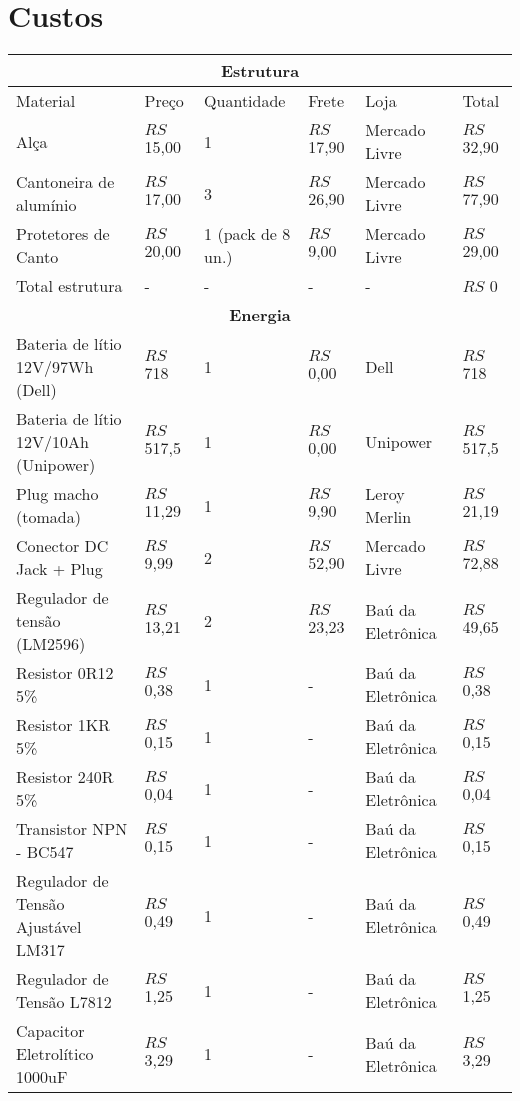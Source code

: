 \section{Custos}

    
\begin{table}[h!]
\centering
\begin{tabular}{| m{4cm}|m{2cm}|m{2cm}|m{2cm}|m{2cm}|m{2cm}|}
\hline
\multicolumn{6}{|c|}{\textbf{Estrutura}}\\
\hline
Material & Preço  & Quantidade & Frete & Loja & Total  \\ 
\hline
Alça & $RS$ 15,00 & 1 & $RS$ 17,90 & Mercado Livre & $RS$ 32,90 \\ \hline
Cantoneira de alumínio & $RS$ 17,00 & 3 & $RS$ 26,90 & Mercado Livre & $RS$ 77,90 \\ \hline
Protetores de Canto & $RS$ 20,00 & 1 (pack de 8 un.) & $RS$ 9,00 & Mercado Livre & $RS$ 29,00 \\ \hline
Total estrutura & - & - & - & - & $RS$ 0 \\\hline
\multicolumn{6}{|c|}{\textbf{Energia}}\\
\hline
Bateria de lítio 12V/97Wh (Dell) & $RS$ 718 & 1 & $RS$ 0,00 & Dell & $RS$ 718 \\\hline
Bateria de lítio 12V/10Ah (Unipower) & $RS$ 517,5 & 1 & $RS$ 0,00 & Unipower & $RS$ 517,5 \\\hline
Plug macho (tomada) & $RS$ 11,29 & 1 & $RS$ 9,90 & Leroy Merlin & $RS$ 21,19 \\\hline
Conector DC Jack + Plug & $RS$ 9,99 & 2 & $RS$ 52,90 & Mercado Livre & $RS$ 72,88 \\\hline
Regulador de tensão (LM2596) & $RS$ 13,21 & 2 & $RS$ 23,23 & Baú da Eletrônica & $RS$ 49,65 \\\hline
Resistor 0R12 5\% & $RS$ 0,38 & 1 & - & Baú da Eletrônica & $RS$ 0,38 \\\hline
Resistor 1KR 5\% & $RS$  0,15 & 1 & - & Baú da Eletrônica & $RS$ 0,15 \\\hline
Resistor 240R 5\% & $RS$ 0,04 & 1 & - & Baú da Eletrônica & $RS$ 0,04 \\\hline
Transistor NPN - BC547 & $RS$ 0,15 & 1 & - & Baú da Eletrônica & $RS$ 0,15 \\\hline
Regulador de Tensão Ajustável LM317 & $RS$ 0,49 & 1 & - & Baú da Eletrônica & $RS$ 0,49 \\\hline
Regulador de Tensão L7812 & $RS$ 1,25 & 1 & - & Baú da Eletrônica & $RS$ 1,25 \\\hline
Capacitor Eletrolítico 1000uF & $RS$ 3,29 & 1 & - & Baú da Eletrônica & $RS$ 3,29 \\\hline

\end{tabular}
\end{table}

